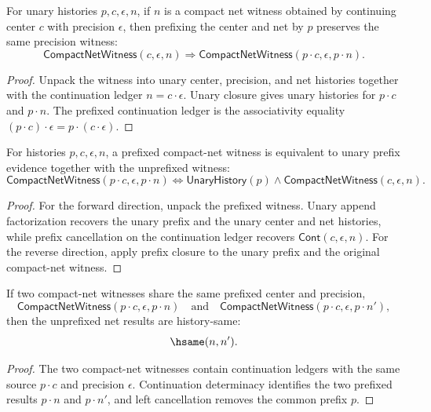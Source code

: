 \begin{theorem}
\label{thm:compact-net-witness-prefix-closed}
For unary histories $p,c,\epsilon,n$, if $n$ is a compact net witness obtained
by continuing center $c$ with precision $\epsilon$, then prefixing the center
and net by $p$ preserves the same precision witness:
$$
\mathsf{CompactNetWitness}(c,\epsilon,n)
\Longrightarrow
\mathsf{CompactNetWitness}(p \cdot c,\epsilon,p \cdot n).
$$
\end{theorem}
\begin{proof}
Unpack the witness into unary center, precision, and net histories together
with the continuation ledger $n=c\cdot\epsilon$. Unary closure gives unary
histories for $p\cdot c$ and $p\cdot n$. The prefixed continuation ledger is
the associativity equality $(p\cdot c)\cdot\epsilon=p\cdot(c\cdot\epsilon)$.
\end{proof}

\begin{theorem}
\label{thm:compact-net-witness-prefix-iff}
For histories $p,c,\epsilon,n$, a prefixed compact-net witness is equivalent
to unary prefix evidence together with the unprefixed witness:
$$
\mathsf{CompactNetWitness}(p \cdot c,\epsilon,p \cdot n)
\Longleftrightarrow
\mathsf{UnaryHistory}(p)\wedge
\mathsf{CompactNetWitness}(c,\epsilon,n).
$$
\end{theorem}
\begin{proof}
For the forward direction, unpack the prefixed witness. Unary append
factorization recovers the unary prefix and the unary center and net histories,
while prefix cancellation on the continuation ledger recovers
$\mathsf{Cont}(c,\epsilon,n)$. For the reverse direction, apply prefix closure
to the unary prefix and the original compact-net witness.
\end{proof}

\begin{theorem}
\label{thm:compact-net-witness-prefixed-result-deterministic}
If two compact-net witnesses share the same prefixed center and precision,
$$
\mathsf{CompactNetWitness}(p\cdot c,\epsilon,p\cdot n)
\quad\text{and}\quad
\mathsf{CompactNetWitness}(p\cdot c,\epsilon,p\cdot n'),
$$
then the unprefixed net results are history-same:
$$
\hsame(n,n').
$$
\end{theorem}
\begin{proof}
The two compact-net witnesses contain continuation ledgers with the same source
$p\cdot c$ and precision $\epsilon$. Continuation determinacy identifies the
two prefixed results $p\cdot n$ and $p\cdot n'$, and left cancellation removes
the common prefix $p$.
\end{proof}

